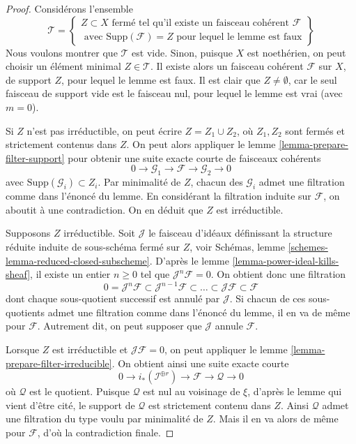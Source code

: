 \begin{proof}
Considérons l'ensemble
$$
\mathcal{T} =
\left\{
\begin{matrix}
Z \subset X
\text{ fermé tel qu'il existe un faisceau cohérent }
\mathcal{F} \\
\text{ avec }
\text{Supp}(\mathcal{F}) = Z
\text{ pour lequel le lemme est faux}
\end{matrix}
\right\}
$$
Nous voulons montrer que $\mathcal{T}$ est vide. Sinon,
puisque $X$ est noethérien, on peut choisir un élément minimal
$Z \in \mathcal{T}$. Il existe alors un faisceau
cohérent $\mathcal{F}$ sur $X$, de support $Z$, pour lequel le lemme
est faux. Il est clair que $Z \not = \emptyset$, car le
seul faisceau de support vide est le faisceau nul, pour lequel le
lemme est vrai (avec $m = 0$).

\medskip\noindent
Si $Z$ n'est pas irréductible, on peut écrire $Z = Z_1 \cup Z_2$,
où $Z_1, Z_2$ sont fermés et strictement contenus dans $Z$.
On peut alors appliquer le lemme \ref{lemma-prepare-filter-support}
pour obtenir une suite exacte courte de faisceaux cohérents
$$
0 \to
\mathcal{G}_1 \to
\mathcal{F} \to
\mathcal{G}_2 \to 0
$$
avec $\text{Supp}(\mathcal{G}_i) \subset Z_i$. Par minimalité de
$Z$, chacun des $\mathcal{G}_i$ admet une filtration comme dans l'énoncé
du lemme. En considérant la filtration induite sur $\mathcal{F}$,
on aboutit à une contradiction. On en déduit
que $Z$ est irréductible.

\medskip\noindent
Supposons $Z$ irréductible. Soit $\mathcal{J}$ le faisceau d'idéaux définissant
la structure réduite induite de sous-schéma fermé sur $Z$,
voir Schémas, lemme \ref{schemes-lemma-reduced-closed-subscheme}.
D'après le lemme \ref{lemma-power-ideal-kills-sheaf}, il existe un
entier $n \geq 0$ tel que $\mathcal{J}^n\mathcal{F} = 0$. On obtient donc
une filtration
$$
0 = \mathcal{J}^n\mathcal{F} \subset \mathcal{J}^{n - 1}\mathcal{F}
\subset \ldots \subset \mathcal{J}\mathcal{F} \subset \mathcal{F}
$$
dont chaque sous-quotient successif est annulé par $\mathcal{J}$.
Si chacun de ces sous-quotients admet une filtration comme dans l'énoncé du lemme, il
en va de même pour $\mathcal{F}$. Autrement dit, on peut
supposer que $\mathcal{J}$ annule $\mathcal{F}$.

\medskip\noindent
Lorsque $Z$ est irréductible et $\mathcal{J}\mathcal{F} = 0$,
on peut appliquer le lemme \ref{lemma-prepare-filter-irreducible}.
On obtient ainsi une suite exacte courte
$$
0 \to
i_*(\mathcal{I}^{\oplus r}) \to
\mathcal{F} \to
\mathcal{Q} \to 0
$$
où $\mathcal{Q}$ est le quotient.
Puisque $\mathcal{Q}$ est nul au voisinage de $\xi$,
d'après le lemme qui vient d'être cité, le support de $\mathcal{Q}$
est strictement contenu dans $Z$. Ainsi $\mathcal{Q}$
admet une filtration du type voulu par minimalité de $Z$. Mais
il en va alors de même pour $\mathcal{F}$, d'où la contradiction finale.
\end{proof}

